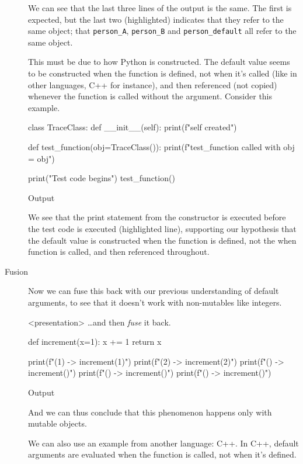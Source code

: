 \begin{description}
    We can see that the last three lines of the output is the same.
    The first is expected, but the last two (highlighted) indicates that they 
    refer to the same object; \ie that \texttt{person_A}, 
    \texttt{person_B} and \texttt{person_default} all 
    refer to the same object.

    This must be due to how Python is constructed.
    The default value seems to be constructed when the function is defined, not 
    when it's called (like in other languages, C++ for instance), and then 
    referenced (not copied) whenever the function is called without the 
    argument.
    Consider this example.

    \begin{pyblock}[default1][highlightlines=5]
class TraceClass:
  def __init__(self):
    print(f"{self} created")

def test_function(obj=TraceClass()):
  print(f"test_function called with obj = {obj}")

print("Test code begins")
test_function()
    \end{pyblock}
    \begin{block}{Output}\printpythontex[verbatim][highlightlines={1}]\end{block}

    We see that the print statement from the constructor is executed before the 
    test code is executed (highlighted line), supporting our hypothesis that 
    the default value is constructed when the function is defined, not the when 
    function is called, and then referenced throughout.

  \item[Fusion] Now we can fuse this back with our previous understanding of 
    default arguments, to see that it doesn't work with non-mutables like 
    integers.
    \begin{frame}<presentation>
      \dots and then \emph{fuse} it back.
    \end{frame}
    \begin{frame}[fragile]
    \begin{pyblock}[default1]
def increment(x=1):
  x += 1
  return x

print(f"(1) -> {increment(1)}")
print(f"(2) -> {increment(2)}")
print(f"()  -> {increment()}")
print(f"()  -> {increment()}")
print(f"()  -> {increment()}")
    \end{pyblock}
    \begin{block}{Output}\printpythontex[verbatim][highlightlines={3-5}]\end{block}
    \end{frame}

    And we can thus conclude that this phenomenon happens only with mutable 
    objects.

    We can also use an example from another language: C++.
    In C++, default arguments are evaluated when the function is called, not 
    when it's defined.
    \begin{frame}[fragile]
      \inputminted[firstline=3]{cpp}{examples/experiment5.cpp}
    \end{frame}
\end{description}

